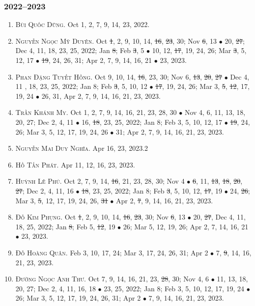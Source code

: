 \documentclass{article}
\begin{document}
\subsubsection{2022--2023}

\begin{enumerate}
	\item \textsc{Bùi Quốc Dũng.} {\sf[In]} Oct 1, 2, 7, 9, 14, 23, 2022. {\sf[Out]}
	\item \textsc{Nguyễn Ngọc Mỹ Duyên.} {\sf[In]} Oct \st{1}, 2, 9, 10, 14, \st{16}, \st{23}, 30; Nov \st{6}, 13 $\bullet$ 20, \st{27}; Dec 4, 11, 18, 23, 25, 2022; Jan \st{8}; Feb \st{3}, 5 $\bullet$ 10, 12, \st{17}, 19, 24, 26; Mar \st{3}, 5, 12, 17 $\bullet$ \st{19}, 24, 26, 31; Apr 2, 7, 9, 14, 16, 21 $\bullet$ 23, 2023.
	\item \textsc{Phan Đặng Tuyết Hồng.} {\sf[In]} Oct 9, 10, 14, \st{16}, 23, 30; Nov 6, \st{13}, \st{20}, \st{27} $\bullet$ Dec 4, 11 , 18, 23, 25, 2022; Jan 8; Feb \st{3}, 5, 10, 12 $\bullet$ \st{17}, 19, 24, 26; Mar 3, \st{5}, \st{12}, 17, 19, 24 $\bullet$ 26, 31, Apr 2, 7, 9, 14, 16, 21, 23, 2023.
	\item \textsc{Trần Khánh My.} {\sf[In]} Oct 1, 2, 7, 9, 14, 16, 21, 23, 28, 30 $\bullet$ Nov 4, 6, 11, 13, 18, 20, 27; Dec 2, 4, 11 $\bullet$ 16, \st{18}, 23, 25, 2022; Jan 8; Feb 3, 5, 10, 12, 17 $\bullet$ \st{19}, 24, 26; Mar 3, 5, 12, 17, 19, 24, 26 $\bullet$ 31; Apr 2, 7, 9, 14, 16, 21, 23, 2023.
	\item \textsc{Nguyễn Mai Duy Nghĩa.} {\sf[In]} Apr 16, 23, 2023.2
	\item \textsc{Hồ Tấn Phát.} {\sf[In]} Apr 11, 12, 16, 23, 2023.
	\item \textsc{Huỳnh Lê Phú.} {\sf[In]} Oct 2, 7, 9, 14, \st{16}, 21, 23, 28, 30; Nov 4 $\bullet$ \st{6}, 11, \st{13}, \st{18}, \st{20}, \st{27}; Dec 2, 4, 11, 16 $\bullet$ \st{18}, 23, 25, 2022; Jan 8; Feb \st{3}, 5, 10, 12, \st{17}, 19 $\bullet$ 24, \st{26}; Mar 3, \st{5}, 12, 17, 19, 24, 26, \st{31} $\bullet$ Apr 2, \st{7}, 9, 14, 16, 21, 23, 2023.
	\item \textsc{Đỗ Kim Phụng.} {\sf[In]} Oct \st{1}, 2, 9, 10, 14, \st{16}, \st{23}, 30; Nov \st{6}, 13 $\bullet$ 20, \st{27}, Dec 4, 11, 18, 25, 2022; Jan \st{8}; Feb 5, \st{12}, 19 $\bullet$ 26; Mar 5, 12, 19, 26; Apr 2, 7, 14, 16, 21 $\bullet$ 23, 2023.
	\item \textsc{Đỗ Hoàng Quân.} {\sf[In]} Feb 3, 10, 17, 24; Mar 3, 17, 24, 26, 31; Apr 2 $\bullet$ 7, \st{9}, 14, 16, 21, 23, 2023.
	\item \textsc{Đường Ngọc Anh Thư.} {\sf[In]} Oct 7, 9, 14, 16, 21, 23, \st{28}, 30; Nov 4, 6 $\bullet$ 11, 13, 18, 20, 27; Dec 2, 4, 11, 16, 18 $\bullet$ 23, 25, 2022; Jan 8; Feb 3, 5, 10, 12, 17, 19, 24 $\bullet$ 26; Mar 3, 5, 12, 17, 19, 24, 26, 31; Apr 2 $\bullet$ 7, 9, 14, 16, 21, 23, 2023.
\end{enumerate}
\end{document}
